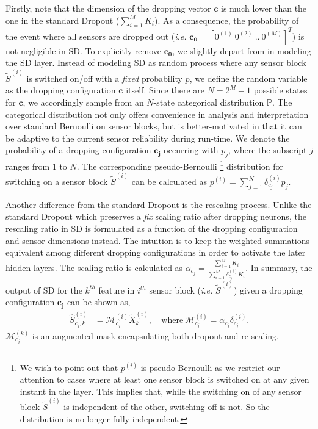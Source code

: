 \documentclass[../thesis.tex]{subfiles}
\begin{document}
Firstly, note that the dimension of the dropping vector $\mathbf{c}$ is much lower than the one in the standard Dropout ($\sum_{i=1}^M K_i$). As a consequence, the probability of the event where all sensors are dropped out (\textit{i.e.} $\mathbf{{c_0}} = [0^{(1)}~0^{(2)}~..~0^{(M)}]^T$) is not negligible in SD. To explicitly remove $\mathbf{{c_0}}$, we slightly depart from \cite{dropout} in modeling the SD layer. Instead of modeling SD as random process where any sensor block $\tilde{S}^{(i)}$ is switched on/off with a \textit{fixed} probability $p$, we define the random variable as the dropping configuration $\mathbf{c}$ itself. Since there are $N = 2^M - 1$ possible states for $\mathbf{c}$, we accordingly sample from an $N$-state categorical distribution $\mathbb{P}$. The categorical distribution not only offers convenience in analysis and interpretation over standard Bernoulli on sensor blocks, but is better-motivated in that it can be adaptive to the current sensor reliability during run-time. We denote the probability of a dropping configuration $\mathbf{{c_j}}$ occurring with $p_j$, where the subscript $j$ ranges from $1$ to $N$. The corresponding pseudo-Bernoulli
\footnote{ 
We wish to point out that $p^{(i)}$ is pseudo-Bernoulli as we restrict our attention to cases where at least one sensor block is switched on at any given instant in the layer. This implies that, while the switching on of any sensor block $\tilde{S}^{(i)}$ is independent of the other, switching off is not. So the distribution is no longer fully independent.
}
distribution for switching on a sensor block $\tilde{S}^{(i)}$ can be calculated as $p^{(i)} = \sum_{j=1}^N\delta_{c_j}^{(i)} p_j$. 


Another difference from the standard Dropout is the rescaling process. Unlike the standard Dropout which preserves a \textit{fix} scaling ratio after dropping neurons, the rescaling ratio in SD is formulated as a function of the dropping configuration and sensor dimensions instead. The intuition is to keep the weighted summations equivalent among different dropping configurations in order to activate the later hidden layers. The scaling ratio is calculated as $\alpha_{c_j} = \frac{\sum_{i=1}^M K_i }{\sum_{i=1}^M \delta_{c_j}^{(i)} K_i}.$ In summary, the output of SD for the $k^{th}$ feature in $i^{th}$ sensor block (\textit{i.e.} $\tilde{S}^{(i)}$) given a dropping configuration $\mathbf{c_j}$ can be shown as,
\begin{align}
\hat{S}^{(i)}_{{c_j},k} &= \mathcal{M}^{(i)}_{c_j} \tilde{X}_k^{(i)}, \ 
&\text{where} \ \mathcal{M}^{(i)}_{c_j} = \alpha_{c_j} \delta_{c_j}^{(i)}. 
\end{align}
$\mathcal{M}^{(k)}_{c_j}$ is an augmented mask encapsulating both dropout and re-scaling. 
 
\end{document}
